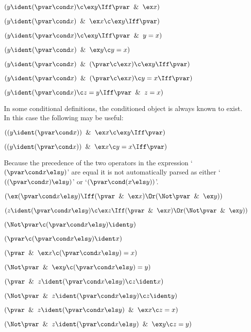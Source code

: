  $(y \ident (\pvar \cond x) \c \ex y \Iff \pvar \And \ex x)$

 $(y \ident (\pvar \cond x) \And \ex x \c \ex y \Iff \pvar )$

 $(y \ident (\pvar \cond x) \c \ex y \Iff \pvar \And y = x)$

 $(y \ident (\pvar \cond x) \And \ex y \c  y = x)$

 $(y \ident (\pvar \cond x) \And (\pvar \c \ex x)
	\c \ex y \Iff \pvar)$

 $(y \ident (\pvar \cond x) \And (\pvar \c \ex x)
	\c y = x \Iff \pvar) $

 $(y \ident (\pvar \cond x)
	\c z = y \Iff \pvar \And z = x) $
	\lineb

In some conditional definitions, the conditioned object is always
known to exist.  In this case the following may be useful:
	\lineb

 $((y \ident (\pvar \cond x)) \And \ex x \c \ex y \Iff \pvar)$

 $((y \ident (\pvar \cond x)) \And \ex x \c y = x \Iff \pvar)$
	\lineb

\lineb

Because the precedence of the two operators in 
the expression `$(\pvar \cond x \els y)$' are equal it
is not automatically parsed as either `$((\pvar \cond x) \els y)$'
or  `$(\pvar \cond (x \els y))$'.

 $(\ex (\pvar \cond x \els y) \Iff (\pvar \And \ex x) \Or(\Not\pvar \And\ex y))$

 $(z \ident (\pvar \cond x \els y) \c \ex z \Iff (\pvar \And \ex x)\Or (\Not\pvar \And \ex y))$

 $(\Not \pvar  \c (\pvar \cond x \els y) \ident y)$

 $(\pvar  \c (\pvar \cond x \els y) \ident x)$

 $(\pvar \And \ex x \c (\pvar \cond x \els y) = x)$

 $(\Not \pvar \And \ex y \c (\pvar \cond x \els y) = y)$

 $(\pvar \And z \ident (\pvar \cond x \els y) \c z \ident x)$

 $(\Not \pvar \And z \ident (\pvar \cond x \els y) \c z \ident y)$

 $(\pvar \And z \ident (\pvar \cond x \els y) \And \ex x \c z = x)$

 $(\Not\pvar \And z \ident (\pvar \cond x \els y) \And \ex y \c z = y)$
\lineb




